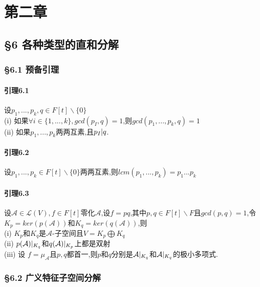 \documentclass{ctexart}
\begin{document}
\section{第二章}
\subsection{§6 各种类型的直和分解}

\subsubsection{§6.1 预备引理}

\paragraph{引理6.1}
设$p_{1},...,p_{k},q \in F[t]\backslash \{0\}$\\
(i) 如果$\forall i \in \{1,...,k\},gcd(p_{I},q) = 1$,则$gcd(p_{1},...,p_{k},q) = 1$\\
(ii) 如果$p_{1},...,p_{k}$两两互素,且$p_{I}\arrowvert q$.\\

\paragraph{引理6.2}
设$p_{1},...,p_{k} \in F[t] \backslash \{0\}$两两互素,则$lcm(p_{1},...,p_{k}) = p_{1}...p_{k}$

\paragraph{引理6.3}
设$\mathcal{A} \in \mathcal{L}(V),f\in F[t]$零化$\mathcal{A}$,设$f=pq$,其中$p,q\in F[t] \backslash F$且$gcd(p,q) = 1$,令$K_{p}=ker(p(\mathcal{A}))$和$K_{q}=ker(q(\mathcal{A}))$,则\\
(i) $K_{p}$和$K_{q}$是$\mathcal{A}$-子空间且$V=K_{p}\bigoplus K_{q}$\\
(ii) $p(\mathcal{A})\arrowvert_{K_{q}}$和$q(\mathcal{A})\arrowvert_{K_{p}}$上都是双射\\
(iii) 设 $f=\mu_{\mathcal{A}}$且$p,q$都首一,则$p$和$q$分别是$\mathcal{A}\arrowvert_{K_{q}}$和$\mathcal{A}\arrowvert_{K_{q}}$的极小多项式.

\subsubsection{§6.2 广义特征子空间分解}
\end{document}
